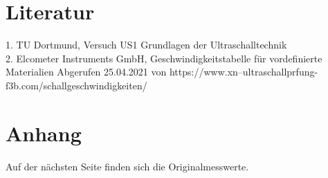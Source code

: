 \section{Literatur}
\label{sec:literatur}
1. TU Dortmund, Versuch US1 Grundlagen der Ultraschalltechnik\\
2. Elcometer Instruments GmbH, Geschwindigkeitstabelle für vordefinierte Materialien Abgerufen 25.04.2021 von https://www.xn--ultraschallprfung-f3b.com/schallgeschwindigkeiten/
\section{Anhang}
Auf der nächsten Seite finden sich die Originalmesswerte.